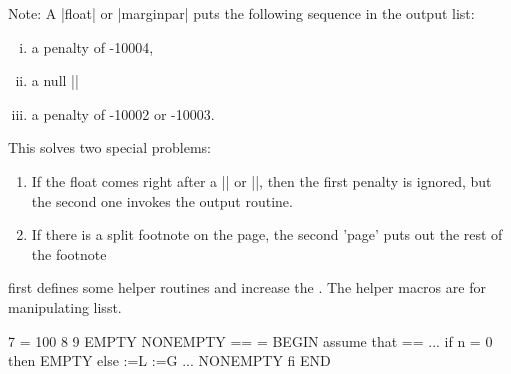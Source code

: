 Note: A |float| or |marginpar| puts the following sequence in the output
list: 

\begin{enumerate}[(i)]
\item a penalty of -10004,

\item a null |\vbox|

\item a penalty of -10002 or -10003.
\end{enumerate}

This solves two special problems:

\begin{enumerate}
\item If the float comes right after a |\newpage| or |\clearpage|,
then the first penalty is ignored, but the second one
invokes the output routine.

\item If there is a split footnote on the page, the second 'page'
puts out the rest of the footnote
\end{enumerate}

\latex first defines some helper routines and increase the . The helper macros are for
manipulating lisst.

\begin{Code}
7 \maxdeadcycles = 100
8 \let\@elt\relax
9 \def\@next#1#2#3#4{\ifx#2\@empty #4 \expandafter\@xnext #2\@@#1#2#3\fi}
\@next \CS \LIST {NONEMPTY}{EMPTY} == %
\@elt = \relax
BEGIN assume that \LIST == \@elt {} ... \@elt \Bn
if n = 0
then EMPTY
else \CS :=L 
\LIST :=G \@elt {} ... \@elt \Bn
NONEMPTY
fi
END

\end{Code}


\begin{Code}
11 \def\@xnext \@elt #1#2\@@#3#4{\def#3{#1}\gdef#4{#2}}

12 \def\@testfalse{\global\let\if@test\iffalse}
13 \def\@testtrue {\global\let\if@test\iftrue}
14 \@testfalse}
   }

15 \def\@bitor#1#2{\@testfalse {\let\@elt\@xbitor
16   \@tempcnta #1\relax #2}}

17 \def\@xbitor #1{\@tempcntb \count#1
18    \ifnum \@tempcnta =\z@
19    \else
20      \divide\@tempcntb\@tempcnta
21    \ifodd\@tempcntb \@testtrue\fi
22   \fi}
\end{Code}

